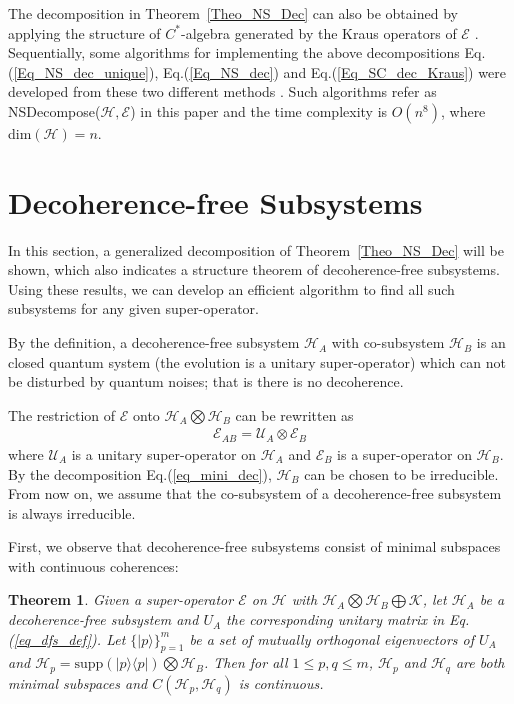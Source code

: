 \documentclass[journal]{IEEEtran}
\def\h{\ensuremath{\mathcal{H}}}
\def\u{\ensuremath{\mathcal{U}}}
\def\k{\ensuremath{\mathcal{K}}}
\def\u{\ensuremath{\mathcal{U}}}
\def\e{\ensuremath{\mathcal{E}}}
\def\k{\mathcal{K}}
\newtheorem{theorem}{Theorem}
\begin{document}
The decomposition in Theorem~\ref{Theo_NS_Dec} can also be obtained by applying the structure of  $C^*$-algebra generated by the Kraus operators of $\e$ \cite{choi2006method}. Sequentially, some algorithms for implementing the above decompositions Eq.(\ref{Eq_NS_dec_unique}), Eq.(\ref{Eq_NS_dec}) and Eq.(\ref{Eq_SC_dec_Kraus}) were developed from these two different methods \cite{guan2016decomposition,knill2006protected,wang2013numerical}.  Such algorithms refer as NSDecompose($\h,\e$) in this paper and the time complexity is $O(n^{8})$, where dim$(\h)=n$. 



\section{Decoherence-free Subsystems}
In this section, a generalized decomposition of Theorem~\ref{Theo_NS_Dec} will be shown, which also indicates a structure theorem of decoherence-free subsystems. Using these results, we can develop an efficient algorithm to find all such subsystems for any given super-operator. 


By the definition, a decoherence-free subsystem $\h_A$ with co-subsystem $\h_B$  is an closed quantum system (the evolution is a unitary super-operator) which can not be disturbed by quantum noises; that is there is no decoherence. 
 
The restriction of $\e$ onto $\h_A\bigotimes\h_B $ can be rewritten as \begin{eqnarray}\label{eq_dfs_form}
  \e_{AB}=\u_A\otimes \e_{B}
\end{eqnarray} where $\u_A$ is a unitary super-operator  on $\h_A$ and $\e_B$ is a super-operator on $\h_{B}.$ By the decomposition Eq.(\ref{eq_mini_dec}), $\h_B$ can be chosen to be  irreducible. From now on, we assume that the co-subsystem of a decoherence-free subsystem is always irreducible.

First, we observe that  decoherence-free subsystems consist of minimal subspaces with continuous coherences:
\begin{theorem}\label{Theo_dfs_cc}
    Given a super-operator $\e$ on $\h$ with $\h_A\bigotimes\h_B\bigoplus \k$, let $\h_A$ be a decoherence-free subsystem and $U_A$  the corresponding unitary matrix in Eq.(\ref{eq_dfs_def}). Let  $\{|p\rangle\}_{p=1}^{m}$ be a set of mutually orthogonal eigenvectors of $U_A$ and $\h_p=\textrm{supp}(|p\rangle\langle p|)\bigotimes \h_B$. Then for all $1\leq p,q\leq m$,  $\h_p$ and $\h_q$ are both minimal subspaces and
    $C(\h_p,\h_q)$ is continuous.
  \end{theorem}  
\end{document}
